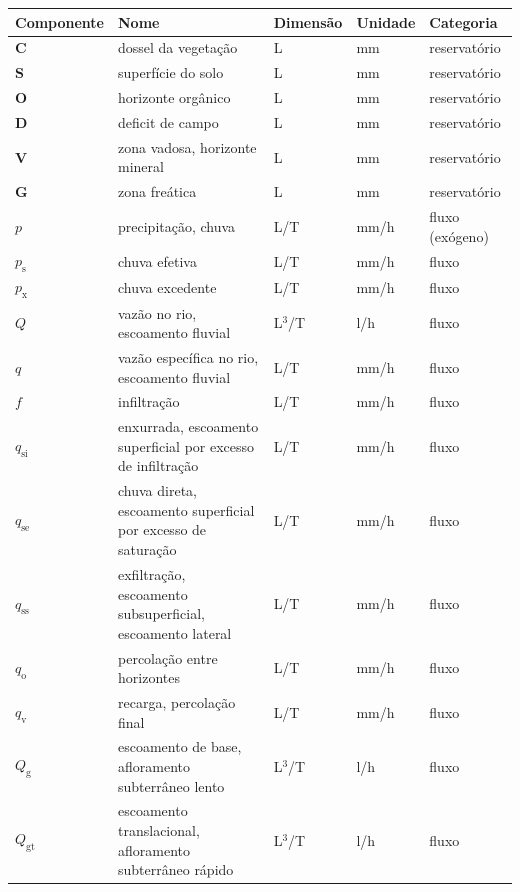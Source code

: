 \documentclass[./main.tex]{subfiles}
\begin{document}
{\renewcommand{\arraystretch}{1.5}%
\begin{table}[t!]
    \centering	
    \tiny
    \sffamily
    \begin{tabular}{ 
        >{\raggedright\arraybackslash}m{1cm}  
        >{\raggedright\arraybackslash}m{6cm}  
        >{\raggedright\arraybackslash}m{1cm}
        >{\raggedright\arraybackslash}m{1cm}
        >{\raggedright\arraybackslash}m{2cm}}
        \toprule
        \textbf{Componente} & \textbf{Nome} & \textbf{Dimensão} & \textbf{Unidade} & \textbf{Categoria} \\ 
        \midrule
        
        $\textbf{C}$ & dossel da vegetação & L & mm & reservatório \\ 
        $\textbf{S}$ & superfície do solo & L & mm & reservatório \\ 
        $\textbf{O}$ & horizonte orgânico & L & mm & reservatório \\ 
        $\textbf{D}$ & deficit de campo & L & mm & reservatório \\
        $\textbf{V}$ & zona vadosa, horizonte mineral & L & mm & reservatório \\
        $\textbf{G}$ & zona freática & L & mm & reservatório \\
        
        $p$ & precipitação, chuva & L/T & mm/h & fluxo (exógeno)\\
        $p_{\text{s}}$ & chuva efetiva & L/T & mm/h & fluxo\\
        $p_{\text{x}}$ & chuva excedente & L/T & mm/h & fluxo\\
        
        $Q$ & vazão no rio, escoamento fluvial & L$^{3}$/T & l/h & fluxo\\
        $q$ & vazão específica no rio, escoamento fluvial & L/T & mm/h & fluxo\\
        
        $f$ & infiltração & L/T & mm/h & fluxo\\        
        $q_{\text{si}}$ & enxurrada, escoamento superficial por excesso de infiltração & L/T & mm/h & fluxo\\
        $q_{\text{se}}$ & chuva direta, escoamento superficial por excesso de saturação & L/T & mm/h & fluxo\\
        $q_{\text{ss}}$ & exfiltração, escoamento subsuperficial, escoamento lateral & L/T & mm/h & fluxo\\
        $q_{\text{o}}$ & percolação entre horizontes & L/T & mm/h & fluxo\\
        $q_{\text{v}}$ & recarga, percolação final & L/T & mm/h & fluxo\\
        $Q_{\text{g}}$ & escoamento de base, afloramento subterrâneo lento & L$^{3}$/T & l/h & fluxo\\
        $Q_{\text{gt}}$ & escoamento translacional, afloramento subterrâneo rápido & L$^{3}$/T & l/h & fluxo\\ 
        

\end{tabular}
\end{table}}
\end{document}
